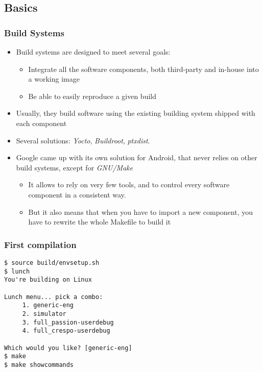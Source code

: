 \subsection{Basics}
\begin{frame}
  \frametitle{Build Systems}
  \begin{itemize}
  \item Build systems are designed to meet several goals:
    \begin{itemize}
    \item Integrate all the software components, both third-party and
      in-house into a working image
    \item Be able to easily reproduce a given build
    \end{itemize}
  \item Usually, they build software using the existing building system shipped with
    each component
  \item Several solutions: \emph{Yocto}, \emph{Buildroot},
    \emph{ptxdist}.
  \item Google came up with its own solution for Android, that never relies on
    other build systems, except for \emph{GNU/Make}
    \begin{itemize}
    \item It allows to rely on very few tools, and to
      control every software component in a consistent way.
    \item But it also means that when you have to import a new
      component, you have to rewrite the whole Makefile to build it
    \end{itemize}
  \end{itemize}
\end{frame}

\begin{frame}[fragile]
  \frametitle{First compilation}
\begin{verbatim}
$ source build/envsetup.sh
$ lunch
You're building on Linux

Lunch menu... pick a combo:
     1. generic-eng
     2. simulator
     3. full_passion-userdebug
     4. full_crespo-userdebug

Which would you like? [generic-eng]
$ make
$ make showcommands
\end{verbatim}
\end{frame}
